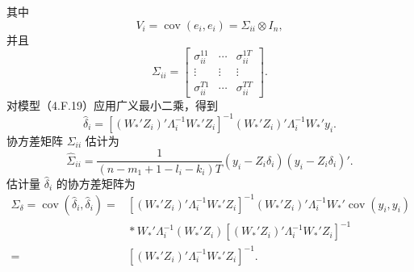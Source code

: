 其中
\begin{equation}
V_i=\operatorname{cov}(e_i,e_i)=\Sigma_{ii}\otimes I_n,\tag{4.F.21}
\end{equation}
并且
\begin{equation}
\Sigma_{ii}=\begin{bmatrix}
\sigma_{ii}^{11}&\cdots&\sigma_{ii}^{1T}\\
\vdots&\vdots&\vdots\\\sigma_{ii}^{T1}&\cdots&\sigma_{ii}^{TT}
\end{bmatrix}.\tag{4.F.22}
\end{equation}
对模型（4.F.19）应用广义最小二乘，得到
\begin{equation}
\widehat\delta_i=
[(W_*'Z_i)'\Lambda_i^{-1}W_*'Z_i]^{-1}
(W_*'Z_i)'\Lambda_i^{-1}W_*'y_i.\tag{4.F.23}
\end{equation}
协方差矩阵 $\Sigma_{ii}$ 估计为
\begin{equation}
\widehat\Sigma_{ii}=\frac1{(n-m_1+1-l_i-k_i)T}
(y_i-Z_i\delta_i)(y_i-Z_i\delta_i)'.\tag{4.F.24}
\end{equation}
估计量 $\widehat\delta_i$ 的协方差矩阵为
\begin{equation}
\begin{aligned}
\Sigma_\delta=\operatorname{cov}(\widehat\delta_i,\widehat\delta_i)
={}&[(W_*'Z_i)'\Lambda_i^{-1}W_*'Z_i]^{-1}
(W_*'Z_i)'\Lambda_i^{-1}W_*'\operatorname{cov}(y_i,y_i)\\
&{}*W_*'\Lambda_i^{-1}(W_*'Z_i)
[(W_*'Z_i)'\Lambda_i^{-1}W_*'Z_i]^{-1}\\
={}&[(W_*'Z_i)'\Lambda_i^{-1}W_*'Z_i]^{-1}.
\end{aligned}\tag{4.F.25}
\end{equation}
